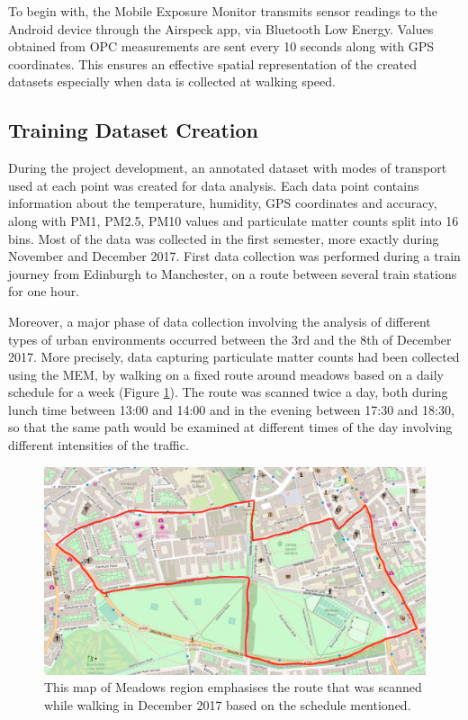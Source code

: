 \documentclass[bsc,frontabs,twoside,singlespacing, parskip,deptreport]{infthesis}     %
\begin{document}
To begin with, the Mobile Exposure Monitor transmits sensor readings to the Android device through the Airspeck app, via Bluetooth Low Energy. Values obtained from OPC measurements are sent every 10 seconds along with GPS coordinates. This ensures an effective spatial representation of the created datasets especially when data is collected at walking speed.

\subsection{Training Dataset Creation}
\label{subsec:training-dataset}

During the project development, an annotated dataset with modes of transport used at each point was created for data analysis. Each data point contains information about the temperature, humidity, GPS coordinates and accuracy, along with PM1, PM2.5, PM10 values and particulate matter counts split into 16 bins. Most of the data was collected in the first semester, more exactly during November and December 2017. First data collection was performed during a train journey from Edinburgh to Manchester, on a route between several train stations for one hour.

Moreover, a major phase of data collection involving the analysis of different types of urban environments occurred between the 3rd and the 8th of December 2017. More precisely, data capturing particulate matter counts had been collected using the MEM, by walking on a fixed route around meadows based on a daily schedule for a week (Figure \ref{fig:december_route}). The route was scanned twice a day, both during lunch time between 13:00 and 14:00 and in the evening between 17:30 and 18:30, so that the same path would be examined at different times of the day involving different intensities of the traffic.

\begin{figure}[h]
  \center
  \includegraphics[width=\columnwidth]{december_route.png} 
  \caption{This map of Meadows region emphasises the route that was scanned while walking in December 2017 based on the schedule mentioned.}
  \label{fig:december_route}
\end{figure}
\end{document}
